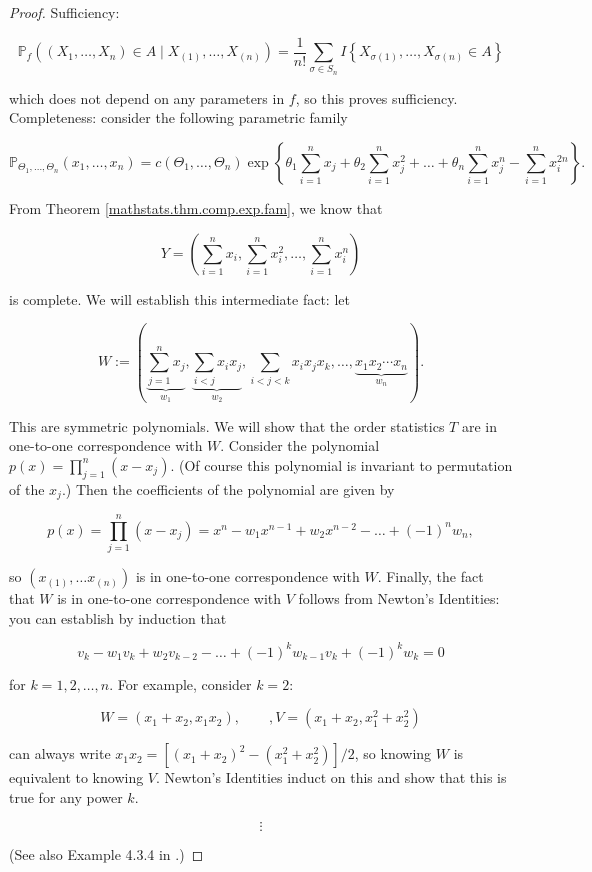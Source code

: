 \begin{proof}

Sufficiency: 

\[
\mathbb{P}_f \left( (X_1, \ldots, X_n) \in A \mid X_{(1)}, \ldots, X_{(n)} \right) = \frac{1}{n!} \sum_{\sigma \in S_n} I \left\{  X_{\sigma(1)}, \ldots, X_{\sigma(n)} \in A \right\}
\]

which does not depend on any parameters in \(f\), so this proves sufficiency. Completeness: consider the following parametric family 

\[
\mathbb{P}_{\Theta_1, \ldots, \Theta_n}(x_1, \ldots, x_n) = c(\Theta_1, \ldots, \Theta_n) \exp \left\{ \theta_1 \sum_{i=1}^n x_j +  \theta_2 \sum_{i=1}^n x_j^2 + \ldots + \theta_n \sum_{i=1}^n x_j^n - \sum_{i=1}^n x_i^{2n}   \right\}.
\]

From Theorem \ref{mathstats.thm.comp.exp.fam}, we know that 

\[
Y = \left( \sum_{i=1}^n x_i, \sum_{i=1}^n x_i^2, \ldots, \sum_{i=1}^n x_i^n \right)
\]


is complete. We will establish this intermediate fact: let

\[
W := \left( \underbrace{\sum_{j=1}^n x_j}_{w_1}, \underbrace{ \sum_{i < j}  x_i x_j}_{w_2}, \sum_{i < j < k} x_i x_j x_k, \ldots, \underbrace{x_1 x_2 \cdots x_n}_{w_n} \right).
\]

This are symmetric polynomials. We will show that the order statistics \(T\) are in one-to-one correspondence with \(W\). Consider the polynomial \(p(x) = \prod_{j=1}^n (x - x_j)\). (Of course this polynomial is invariant to permutation of the \(x_j\).) Then the coefficients of the polynomial are given by 

\[
p(x) = \prod_{j=1}^n (x - x_j) = x^n - w_1 x^{n-1}  + w_2 x^{n-2} - \ldots + (-1)^n w_n,
\]

so \((x_{(1)}, \ldots x_{(n)})\) is in one-to-one correspondence with \(W\). Finally, the fact that \(W\) is in one-to-one correspondence with \(V\) follows from Newton's Identities: you can establish by induction that 

\[
v_k - w_1 v_k + w_2 v_{k-2} - \ldots + (-1)^k w_{k-1}v_k + (-1)^k w_k = 0
\]

for \(k = 1, 2, \ldots ,n\). For example, consider \(k=2\):

\[
W = (x_1 + x_2, x_1 x_2) , \qquad, V = (x_1 + x_2, x_1^2 + x_2^2)
\]

can always write \(x_1 x_2 =  \left[ (x_1 + x_2)^2 - (x_1 ^2 + x_2^2)\right]/2\), so knowing \(W\) is equivalent to knowing \(V\). Newton's Identities induct on this and show that this is true for any power \(k\).  

\[
\vdots
\]


(See also Example 4.3.4 in \citet{lehmann2005testing}.)

\end{proof}

